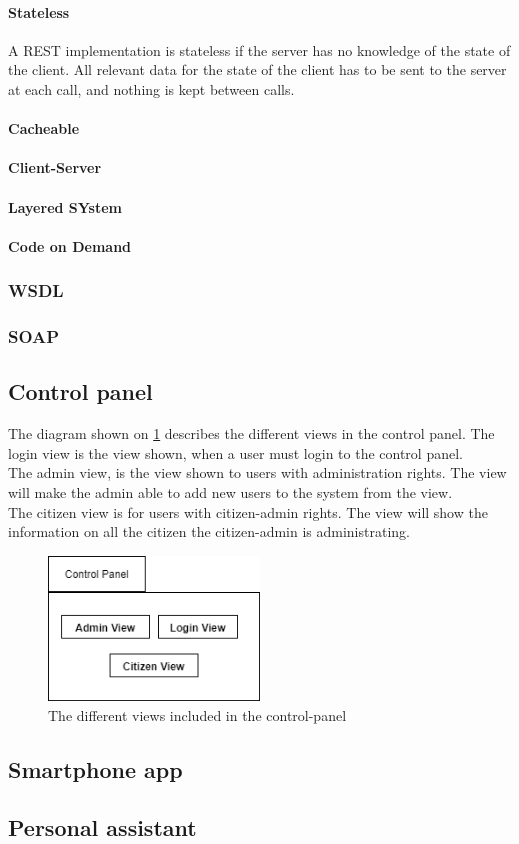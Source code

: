 \paragraph{Stateless} A REST implementation is stateless if the server has no knowledge of the state of the client. All relevant data for the state of the client has to be sent to the server at each call, and nothing is kept between calls.
\paragraph{Cacheable} 
\paragraph{Client-Server} 
\paragraph{Layered SYstem} 
\paragraph{Code on Demand} 

\subsubsection{WSDL}

\subsubsection{SOAP}


\subsection{Control panel}
The diagram shown on \ref{fig:controlpanel} describes the different views in the control panel. The login view is the view shown, when a user must login to the control panel.\\
The admin view, is the view shown to users with administration rights. The view will make the admin able to add new users to the system from the view.\\
The citizen view is for users with citizen-admin rights. The view will show the information on all the citizen the citizen-admin is administrating.

\begin{figure}[H]
    \centering
    \includegraphics[width=0.5\textwidth]{Figures/ControlPanel.png}
    \caption{The different views included in the control-panel}
    \label{fig:controlpanel}
\end{figure}

\subsection{Smartphone app}

\subsection{Personal assistant}